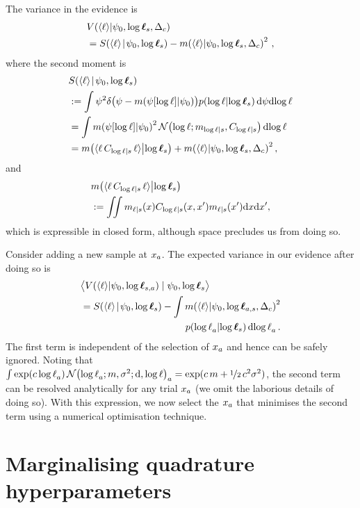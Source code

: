 \documentclass{article}
\begin{document}
The variance in the evidence is
\begin{align*}
& \cov{\inty{\lfn}}{\psi_0,\tvr_s,\Delta_c}\\ 
& = \secm{\inty{\lfn}}{\psi_0,\tvr_s} - \mean{\inty{\lfn}}{\psi_0,\tvr_s,\Delta_c}^2\,,
\end{align*}
where the second moment is 
\begin{align*}
& \secm{\inty{\lfn}}{\psi_0,\tvr_s}  \\
& \deq \int \psi^2 
\delta\bigl(\psi - \mean{\psi[\tr]}{\psi_0}\bigr)
\p{\tr}{\tvr_s}
\ud\psi \ud\tr\\
& = \int \mean{\psi[\tr]}{\psi_0}^2
\N{\tr}{\meancondfn{\tr}{s}}{C_{\tr|s}}
 \ud\tr\\
& = \mean{\inty{\lfn\,C_{\tr|s}\,\lfn}}{\tvr_s}+
\mean{\inty{\lfn}}{\psi_0,\tvr_s,\Delta_c}^2,
\end{align*}
and
\begin{align*}
  &\mean{\inty{\lfn\,C_{\tr|s}\,\lfn}}{\tvr_s} \\ &\deq
 \iint m_{\lfn|s}(\lfv) C_{\tr|s}(\lfv,\lfv') m_{\lfn|s}(\lfv') \ud \lfv \ud\lfv',
\end{align*}
which is expressible in closed form, although space precludes us from doing so.

Consider adding a new sample at $\lfv_a$. The expected variance in our evidence after doing so is
\begin{align}
&\bigl\langle \cov{\inty{\lfn}}{\psi_0,\tvr_{s,a}}\mid \psi_0,\tvr_{s}\bigr\rangle 
\nonumber\\
& = \secm{\inty{\lfn}}{\psi_0,\tvr_s} 
- \int\mean{\inty{\lfn}}{\psi_0,\tvr_{a,s},\Delta_c}^2\nonumber\\
& \hspace{3.8cm} \p{\tr_a}{\tvr_s}\ud\tr_a\,.\label{eqn:exp_var}
\end{align}
The first term is independent of the selection of $\lfv_a$ and hence can be safely ignored. Noting that $\int \exp(c\, \tr_a)\, \N{\tr_a;m, \sigma^2} \ud\tr_a = \exp(c\, m + \nicefrac{1}{2}\, c^2 \sigma^2)$, the second term can be resolved analytically for any trial $\lfv_a$ (we omit the laborious details of doing so). With this expression, we now select the $\lfv_a$ that minimises the second term using a numerical optimisation technique. 

\section{Marginalising quadrature hyperparameters}
\end{document}
